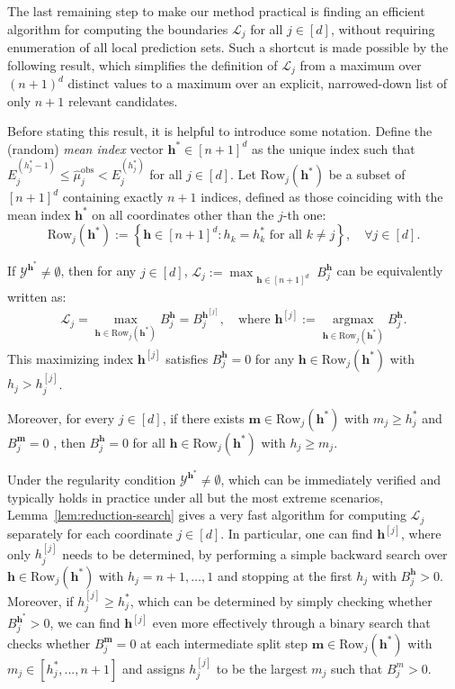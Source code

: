 The last remaining step to make our method practical is finding an efficient algorithm for computing the boundaries $\mathcal{L}_j$ for all $j \in [d]$, without requiring enumeration of all local prediction sets. 
Such a shortcut is made possible by the following result, which simplifies the definition of $\mathcal{L}_j$ from a maximum over $(n+1)^d$ distinct values to a maximum over an explicit, narrowed-down list of only $n+1$ relevant candidates.

Before stating this result, it is helpful to introduce some notation. 
Define the (random) \emph{mean index} vector $\mathbf{h}^* \in [n+1]^d$ as the unique index such that $E^{(h^*_j-1)}_j \le \hat{\mu}_j^\mathrm{obs} < E^{(h^*_j)}_j$ for all $j \in [d]$.
Let $\mathrm{Row}_j(\mathbf{h}^*)$ be a subset of $[n+1]^d$ containing exactly $n+1$ indices, defined as those coinciding with the mean index $\mathbf{h}^*$ on all coordinates other than the $j$-th one:
\[
\mathrm{Row}_j(\mathbf{h}^*):=\left\{\mathbf{h}\in[n{+}1]^d : h_k = h^*_k \text{ for all } k\neq j \right\}, \quad\forall j \in [d].
\]

\begin{lemma}
If $\mathcal{Y}^{\mathbf{h}^*} \neq \emptyset$, then for any $j \in [d]$, $\mathcal{L}_j := \max_{\substack{\mathbf{h} \in [n+1]^d}}B^{\mathbf{h}}_j$ can be equivalently written as:
    \begin{align*}
    \mathcal{L}_j= \max_{\mathbf{h} \in \mathrm{Row}_j(\mathbf{h}^*)} B^{\mathbf{h}}_j = B^{\mathbf{h}^{[j]}}_j,
      \quad
      \text{where }\mathbf{h}^{[j]} := \operatorname*{argmax}_{\mathbf{h} \in \mathrm{Row}_j(\mathbf{h}^*)} B^{\mathbf{h}}_j.
    \end{align*}
    This maximizing index $\mathbf{h}^{[j]}$ satisfies $B^{\mathbf{h}}_j= 0$ for any $\mathbf{h} \in \mathrm{Row}_j(\mathbf{h}^*)$ with $h_j > h^{[j]}_j$.
    
    Moreover, for every $j \in [d]$, if there exists $\mathbf{m}\in\mathrm{Row}_j(\mathbf{h}^*)$ with $m_j\geq h^*_j$ and $B^{\mathbf{m}}_j=0$
    , then $B^{\mathbf{h}}_j=0$ for all $\mathbf{h}\in\mathrm{Row}_j(\mathbf{h}^*)$ with $h_j \geq m_j$.
    \label{lem:reduction-search}
\end{lemma}

Under the regularity condition $\mathcal{Y}^{\mathbf{h}^*} \neq \emptyset$, which can be immediately verified and typically holds in practice under all but the most extreme scenarios, Lemma~\ref{lem:reduction-search} gives a very fast algorithm for computing $\mathcal{L}_j$ separately for each coordinate $j \in [d]$.
In particular, one can find $\mathbf{h}^{[j]}$, where only $h^{[j]}_j$ needs to be determined, by performing a simple
backward search over $\mathbf{h} \in \mathrm{Row}_j(\mathbf{h}^*)$ with $h_j = n+1,\ldots,1$ and stopping at the first $h_j$ with $B^{\mathbf{h}}_j > 0$.
Moreover, if $h^{[j]}_j \geq h^*_j$, which can be determined by simply checking whether $B^{\mathbf{h}^*}_j > 0$,
we can find $\mathbf{h}^{[j]}$ even more effectively through a binary search that checks whether $B^{\mathbf{m}}_j=0$ at each intermediate split step $\mathbf{m} \in \mathrm{Row}_j(\mathbf{h}^*)$ with $m_j \in [h^*_j,...,n+1]$ and assigns $h^{[j]}_j$ to be the largest $m_j$ such that $B^{m}_j > 0$.

